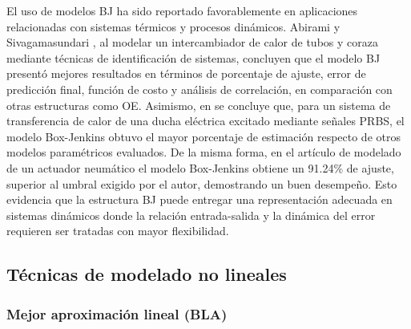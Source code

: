 \documentclass[11pt]{report}
\begin{document}
El uso de modelos BJ ha sido reportado favorablemente en aplicaciones relacionadas con sistemas térmicos y procesos dinámicos. Abirami y Sivagamasundari \cite{Abirami2018STHX}, al modelar un intercambiador de calor de tubos y coraza mediante técnicas de identificación de sistemas, concluyen que el modelo BJ presentó mejores resultados en términos de porcentaje de ajuste, error de predicción final, función de costo y análisis de correlación, en comparación con otras estructuras como OE. Asimismo, en \cite{gunsha2023modelado} se concluye que, para un sistema de transferencia de calor de una ducha eléctrica excitado mediante señales PRBS, el modelo Box-Jenkins obtuvo el mayor porcentaje de estimación respecto de otros modelos paramétricos evaluados. De la misma forma, en el artículo de modelado de un actuador neumático \cite{Muftah2021} el modelo Box-Jenkins obtiene un 91.24\% de ajuste, superior al umbral exigido por el autor, demostrando un buen desempeño. Esto evidencia que la estructura BJ puede entregar una representación adecuada en sistemas dinámicos donde la relación entrada-salida y la dinámica del error requieren ser tratadas con mayor flexibilidad.



\subsection{Técnicas de modelado no lineales}
\subsubsection{Mejor aproximación lineal (BLA)}
\end{document}
